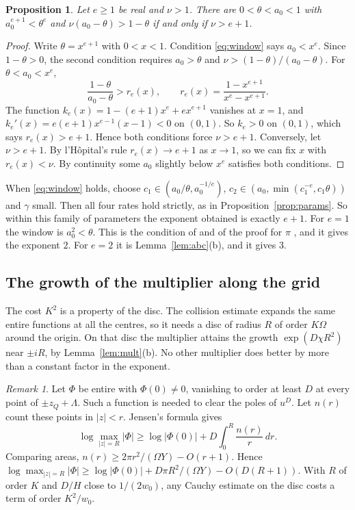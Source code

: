 \documentclass[11pt]{amsart}
\newtheorem{proposition}[theorem]{Proposition}
\theoremstyle{definition}
\theoremstyle{remark}
\newtheorem{remark}[theorem]{Remark}
\numberwithin{equation}{section}
\begin{document}
\begin{proposition}\label{prop:threshold}
Let $e\ge1$ be real and $\nu>1$. There are $0<\theta<a_0<1$ with $a_0^{e+1}<\theta^e$ and
$\nu(a_0-\theta)>1-\theta$ if and only if $\nu>e+1$.
\end{proposition}

\begin{proof}
Write $\theta=x^{e+1}$ with $0<x<1$. Condition \eqref{eq:window} says $a_0<x^e$. Since $1-\theta>0$, the
second condition requires $a_0>\theta$ and $\nu>(1-\theta)/(a_0-\theta)$. For $\theta<a_0<x^e$,
\[
 \frac{1-\theta}{a_0-\theta}>r_e(x),\qquad r_e(x)=\frac{1-x^{e+1}}{x^e-x^{e+1}}.
\]
The function $k_e(x)=1-(e+1)x^e+ex^{e+1}$ vanishes at $x=1$, and $k_e'(x)=e(e+1)x^{e-1}(x-1)<0$ on
$(0,1)$. So $k_e>0$ on $(0,1)$, which says $r_e(x)>e+1$. Hence both conditions force $\nu>e+1$.
Conversely, let $\nu>e+1$. By l'H\^opital's rule $r_e(x)\to e+1$ as $x\to1$, so we can fix $x$ with
$r_e(x)<\nu$. By continuity some $a_0$ slightly below $x^e$ satisfies both conditions.
\end{proof}

When \eqref{eq:window} holds, choose $c_1\in(a_0/\theta,a_0^{-1/e})$, $c_2\in(a_0,\min(c_1^{-e},c_1\theta))$
and $\gamma$ small. Then all four rates hold strictly, as in Proposition~\ref{prop:params}. So within this family
of parameters the exponent obtained is exactly $e+1$. For $e=1$ the window is $a_0^2<\theta$. This is the
condition of \cite[Theorem~17.1]{ChudnovskyChudnovsky26} and of the proof for $\pi$ \cite{OpenAIPi2026}, and it
gives the exponent $2$. For $e=2$ it is Lemma~\ref{lem:abc}(b), and it gives $3$.

\subsection{The growth of the multiplier along the grid}
The cost $K^2$ is a property of the disc. The collision estimate expands the same entire functions at all the
centres, so it needs a disc of radius $R$ of order $K\Omega$ around the origin. On that disc the multiplier
attains the growth $\exp(D\chi R^2)$ near $\pm iR$, by Lemma~\ref{lem:mult}(b). No other multiplier does
better by more than a constant factor in the exponent.

\begin{remark}\label{rem:jensen}
Let $\Phi$ be entire with $\Phi(0)\ne0$, vanishing to order at least $D$ at every point of $\pm z_Q+\Lambda$.
Such a function is needed to clear the poles of $u^D$. Let $n(r)$ count these points in $|z|<r$. Jensen's formula
gives
\[
 \log\max_{|z|=R}|\Phi|\ge\log|\Phi(0)|+D\int_0^R\frac{n(r)}r\,dr.
\]
Comparing areas, $n(r)\ge2\pi r^2/(\Omega Y)-O(r+1)$. Hence
$\log\max_{|z|=R}|\Phi|\ge\log|\Phi(0)|+D\pi R^2/(\Omega Y)-O(D(R+1))$. With $R$ of order $K$ and $D/H$ close to $1/(2w_0)$,
any Cauchy estimate on the disc costs a term of order $K^2/w_0$.
\end{remark}
\end{document}
